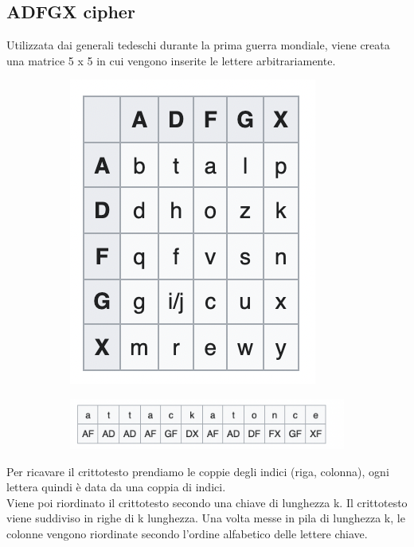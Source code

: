\documentclass[11pt, oneside]{article}   	%
\begin{document}
\subsection*{ADFGX cipher}
Utilizzata dai generali tedeschi durante la prima guerra mondiale, viene creata una matrice 5 x 5 in cui vengono inserite le lettere arbitrariamente.
\begin{figure}[H]
\begin{subfigure}[h]{0.3\linewidth}
\includegraphics[width=\linewidth]{adfgx}
\end{subfigure}
\hfill
\begin{subfigure}[h]{0.6\linewidth}
\includegraphics[width=\linewidth]{word}
\end{subfigure}%
\end{figure}
Per ricavare il crittotesto prendiamo le coppie degli indici (riga, colonna), ogni lettera quindi è data da una coppia di indici. \\Viene poi riordinato il crittotesto secondo una chiave di lunghezza k. Il crittotesto viene suddiviso in righe di k lunghezza. Una volta messe in pila di lunghezza k, le colonne vengono riordinate secondo l'ordine alfabetico delle lettere chiave.
\end{document}
